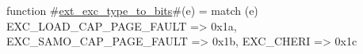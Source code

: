 function #\hyperref[sailRISCVzextzyexczytypezytozybits]{ext\_exc\_type\_to\_bits}#(e) =
  match (e) {
    EXC_LOAD_CAP_PAGE_FAULT => 0x1a,
    EXC_SAMO_CAP_PAGE_FAULT => 0x1b,
    EXC_CHERI               => 0x1c
  }
